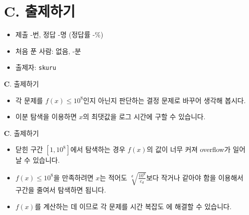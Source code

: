 \section{C. 출제하기}

\begin{frame} %
    \begin{itemize}
        \item 제출 -번, 정답 -명 (정답률 -\%)
        \item 처음 푼 사람: 없음, -분
        \item 출제자: \texttt{skuru}
    \end{itemize}
\end{frame}

\begin{frame}{\textbf{C}. 출제하기}
    \begin{itemize}
        \item 각 문제를 $f(x) \le 10^8$인지 아닌지 판단하는 결정 문제로 바꾸어 생각해 봅시다.
        \item 이분 탐색을 이용하면 $x$의 최댓값을 로그 시간에 구할 수 있습니다.
    \end{itemize}
\end{frame}

\begin{frame}{\textbf{C}. 출제하기}
    \begin{itemize}
        \item 닫힌 구간 $[1, 10^8]$에서 탐색하는 경우 $f(x)$의 값이 너무 커져 overflow가 일어날 수 있습니다.
        \item $f(x) \le 10^8$을 만족하려면 $x$는 적어도 $\sqrt[d]{\frac{10^8}{c_d}}$보다 작거나 같아야 함을 이용해서 구간을 줄여서 탐색하면 됩니다.
        \item $f(x)$를 계산하는 데 이므로 각 문제를 시간 복잡도 에 해결할 수 있습니다.
    \end{itemize}
\end{frame}